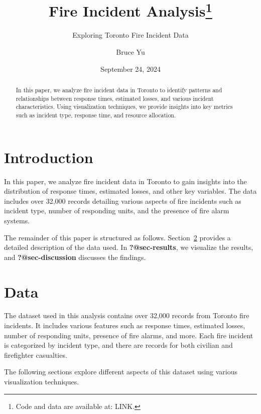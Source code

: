 \documentclass[
  letterpaper,
  DIV=11,
  numbers=noendperiod]{scrartcl}
\title{Fire Incident Analysis\thanks{Code and data are available at:
LINK.}}
\subtitle{Exploring Toronto Fire Incident Data}
\author{Bruce Yu}
\date{September 24, 2024}
\begin{document}
\maketitle
\begin{abstract}
In this paper, we analyze fire incident data in Toronto to identify
patterns and relationships between response times, estimated losses, and
various incident characteristics. Using visualization techniques, we
provide insights into key metrics such as incident type, response time,
and resource allocation.
\end{abstract}
\ifdefined\Shaded\renewenvironment{Shaded}{\begin{tcolorbox}[breakable, enhanced, borderline west={3pt}{0pt}{shadecolor}, interior hidden, frame hidden, boxrule=0pt, sharp corners]}{\end{tcolorbox}}\fi

\hypertarget{introduction}{%
\section{Introduction}\label{introduction}}

In this paper, we analyze fire incident data in Toronto to gain insights
into the distribution of response times, estimated losses, and other key
variables. The data includes over 32,000 records detailing various
aspects of fire incidents such as incident type, number of responding
units, and the presence of fire alarm systems.

The remainder of this paper is structured as follows.
Section~\ref{sec-data} provides a detailed description of the data used.
In \textbf{?@sec-results}, we visualize the results, and
\textbf{?@sec-discussion} discusses the findings.

\hypertarget{sec-data}{%
\section{Data}\label{sec-data}}

The dataset used in this analysis contains over 32,000 records from
Toronto fire incidents. It includes various features such as response
times, estimated losses, number of responding units, presence of fire
alarms, and more. Each fire incident is categorized by incident type,
and there are records for both civilian and firefighter casualties.

The following sections explore different aspects of this dataset using
various visualization techniques.
\end{document}
